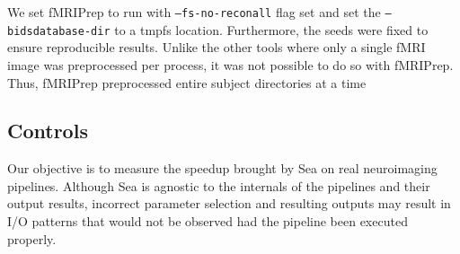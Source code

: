     We set fMRIPrep to run with \texttt{--fs-no-reconall} flag set and set the \texttt{--bids\-database-dir} to a tmpfs location. 
    Furthermore, the seeds were fixed to ensure reproducible results. Unlike the other tools where only a single fMRI image was preprocessed
    per process, it was not possible to do so with fMRIPrep. Thus, fMRIPrep preprocessed entire subject directories at a time

    
    \begin{table}[t]
      \small\centering
      \caption{Pipeline execution characteristics}\label{table:pipelines}
    \end{table}
    \subsection{Controls}
    Our objective is to measure the speedup brought by Sea on real neuroimaging pipelines.
    Although Sea is agnostic to the internals of the pipelines and their output results, incorrect parameter
    selection and resulting outputs may result in I/O patterns that would not be observed had the
    pipeline been executed properly.
    
